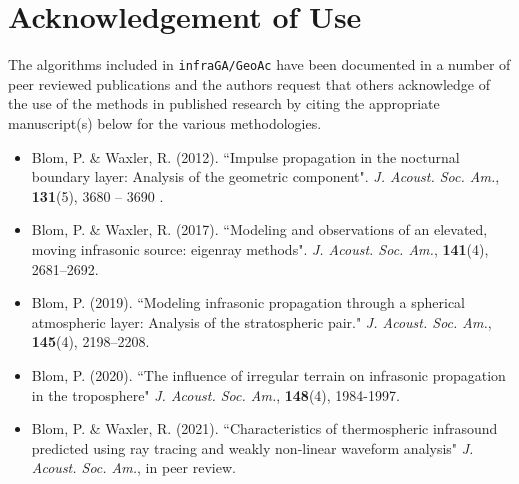 \documentclass[10pt]{article}
\begin{document}
\section{Acknowledgement of Use}
The algorithms included in \verb=infraGA/GeoAc= have been documented in a number of peer reviewed publications and the authors request that others acknowledge of the use of the methods in published research by citing the appropriate manuscript(s) below for the various methodologies.
\begin{itemize}
  \item Blom, P. \& Waxler, R. (2012). ``Impulse propagation in the nocturnal boundary layer: Analysis of the geometric component". \textit{J. Acoust. Soc. Am.}, \textbf{131}(5), 3680 -- 3690 .
  \item Blom, P. \& Waxler, R. (2017). ``Modeling and observations of an elevated, moving infrasonic source: eigenray methods". \textit{J. Acoust. Soc. Am.}, \textbf{141}(4), 2681--2692.
  \item Blom, P. (2019). ``Modeling infrasonic propagation through a spherical atmospheric layer: Analysis of the stratospheric pair." \textit{J. Acoust. Soc. Am.}, \textbf{145}(4), 2198--2208.	
  \item Blom, P. (2020). ``The influence of irregular terrain on infrasonic propagation in the troposphere" \textit{J. Acoust. Soc. Am.}, \textbf{148}(4), 1984-1997.
  \item Blom, P. \& Waxler, R. (2021). ``Characteristics of thermospheric infrasound predicted using ray tracing and weakly non-linear waveform analysis" \textit{J. Acoust. Soc. Am.}, in peer review.	
\end{itemize}
\end{document}
